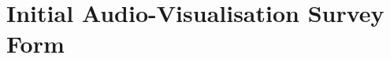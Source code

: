 \documentclass[../initial_thesis.tex]{subfiles}
\begin{document}
\chapter{Initial Audio-Visualisation Survey Form} \label{appendix:survey}

\end{document}

